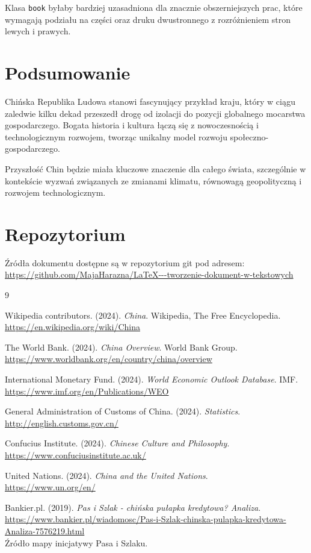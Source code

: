 \documentclass[12pt,a4paper]{report}
\begin{document}
Klasa \texttt{book} byłaby bardziej uzasadniona dla znacznie obszerniejszych prac, które wymagają podziału na części oraz druku dwustronnego z rozróżnieniem stron lewych i prawych.

\section{Podsumowanie}

Chińska Republika Ludowa stanowi fascynujący przykład kraju, który w ciągu zaledwie kilku dekad przeszedł drogę od izolacji do pozycji globalnego mocarstwa gospodarczego. Bogata historia i kultura łączą się z nowoczesnością i technologicznym rozwojem, tworząc unikalny model rozwoju społeczno-gospodarczego.

Przyszłość Chin będzie miała kluczowe znaczenie dla całego świata, szczególnie w kontekście wyzwań związanych ze zmianami klimatu, równowagą geopolityczną i rozwojem technologicznym.

\section{Repozytorium}

Źródła dokumentu dostępne są w repozytorium git pod adresem: \\
\url{https://github.com/MajaHarazna/LaTeX---tworzenie-dokument-w-tekstowych}

\begin{thebibliography}{9}

Wikipedia contributors. (2024). \textit{China}.
Wikipedia, The Free Encyclopedia. \\
\url{https://en.wikipedia.org/wiki/China}

The World Bank. (2024). \textit{China Overview}.
World Bank Group. \\
\url{https://www.worldbank.org/en/country/china/overview}

International Monetary Fund. (2024). \textit{World Economic Outlook Database}.
IMF. \\
\url{https://www.imf.org/en/Publications/WEO}

General Administration of Customs of China. (2024). \textit{Statistics}.\\
\url{http://english.customs.gov.cn/}

Confucius Institute. (2024). \textit{Chinese Culture and Philosophy}.\\
\url{https://www.confuciusinstitute.ac.uk/}

United Nations. (2024). \textit{China and the United Nations}.\\
\url{https://www.un.org/en/}

Bankier.pl. (2019). \textit{Pas i Szlak - chińska pułapka kredytowa? Analiza}.\\
\url{https://www.bankier.pl/wiadomosc/Pas-i-Szlak-chinska-pulapka-kredytowa-Analiza-7576219.html}\\
Źródło mapy inicjatywy Pasa i Szlaku.

\end{thebibliography}
\end{document}
